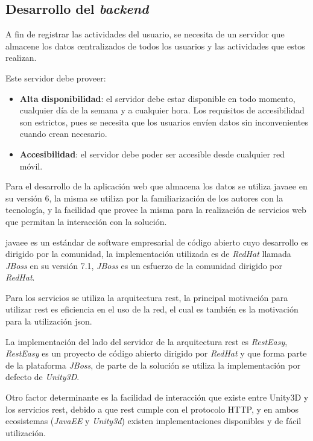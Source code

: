\subsection{Desarrollo del \textit{backend}}

A fin de registrar las actividades del usuario, se necesita de un servidor que
almacene los datos centralizados de todos los usuarios y las actividades que
estos realizan.

Este servidor debe proveer:

\begin{itemize}
    \item \textbf{Alta disponibilidad}: el servidor debe estar disponible en
        todo momento, cualquier día de la semana y a cualquier hora. Los
        requisitos de accesibilidad son estrictos, pues se necesita que los
        usuarios envíen datos sin inconvenientes cuando crean necesario.
    \item \textbf{Accesibilidad}: el servidor debe poder ser accesible desde
        cualquier red móvil.
\end{itemize}

Para el desarrollo de la aplicación web que almacena los datos se utiliza
\Gls{javaee} en su versión 6, la misma se utiliza por la familiarización de los
autores con la tecnología, y la facilidad que provee la misma para la
realización de servicios web que permitan la interacción con la solución.

\Gls{javaee} es un estándar de software empresarial de código abierto cuyo
desarrollo es dirigido por la comunidad\cite{javaee}, la implementación
utilizada es de \textit{RedHat} llamada \textit{JBoss} en su versión 7.1,
\textit{JBoss} es un esfuerzo de la comunidad dirigido por \textit{RedHat}. 

Para los servicios se utiliza la arquitectura \Gls{rest}, la principal
motivación para utilizar \Gls{rest} es eficiencia en el uso de la
red\cite{pautasso2008restful}, el cual es también es la motivación para la
utilización \Gls{json}. 

La implementación del lado del servidor de la arquitectura \Gls{rest} es
\textit{RestEasy}, \textit{RestEasy} es un proyecto de código abierto dirigido
por \textit{RedHat} y que forma parte de la plataforma \textit{JBoss}, de parte
de la solución se utiliza la implementación por defecto de \textit{Unity3D}.

Otro factor determinante es la facilidad de interacción que existe entre Unity3D
y los servicios \Gls{rest}, debido a que \Gls{rest} cumple con el protocolo
HTTP, y en ambos ecosistemas (\textit{JavaEE} y \textit{Unity3d}) existen
implementaciones disponibles y de fácil utilización.

